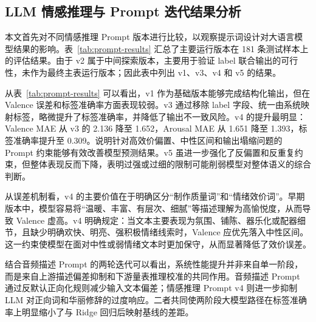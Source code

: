 \subsection{LLM 情感推理与 Prompt 迭代结果分析}

本文首先对不同情感推理 Prompt 版本进行比较，以观察提示词设计对大语言模型结果的影响。表~\ref{tab:prompt-results} 汇总了主要运行版本在 181 条测试样本上的评估结果。由于 v2 属于中间探索版本，主要用于验证 label 联合输出的可行性，未作为最终主表运行版本；因此表中列出 v1、v3、v4 和 v5 的结果。

\begin{table}[htbp]
  \centering
  \caption{不同情感推理 Prompt 版本的评估结果（$n=181$）}
  \label{tab:prompt-results}
\end{table}

从表~\ref{tab:prompt-results} 可以看出，v1 作为基础版本能够完成结构化输出，但在 Valence 误差和标签准确率方面表现较弱。v3 通过移除 label 字段、统一由系统映射标签，略微提升了标签准确率，并降低了输出不一致风险。v4 的提升最明显：Valence MAE 从 v3 的 2.136 降至 1.652，Arousal MAE 从 1.651 降至 1.393，标签准确率提升至 0.309。说明针对高效价偏置、中性区间和输出塌缩问题的 Prompt 约束能够有效改善模型预测结果。v5 虽进一步强化了反偏置和反重复约束，但整体表现反而下降，表明过强或过细的限制可能削弱模型对整体语义的综合判断。

从误差机制看，v4 的主要价值在于明确区分“制作质量词”和“情绪效价词”。早期版本中，模型容易将“温暖、丰富、有层次、细腻”等描述理解为高愉悦度，从而导致 Valence 虚高。v4 明确规定：当文本主要表现为氛围、铺陈、器乐化或配器细节，且缺少明确欢快、明亮、强积极情绪线索时，Valence 应优先落入中性区间。这一约束使模型在面对中性或弱情绪文本时更加保守，从而显著降低了效价误差。

结合音频描述 Prompt 的两轮迭代可以看出，系统性能提升并非来自单一阶段，而是来自上游描述偏差抑制和下游量表推理校准的共同作用。音频描述 Prompt 通过反默认正向化规则减少输入文本偏差；情感推理 Prompt v4 则进一步抑制 LLM 对正向词和华丽修辞的过度响应。二者共同使两阶段大模型路径在标签准确率上明显缩小了与 Ridge 回归后映射基线的差距。

